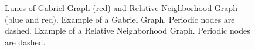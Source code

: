     \begin{figure}[htbp]
        \centering
        \caption[Gabriel - and Relative Neighborhood Graph]
                { Lunes of Gabriel Graph (red)
                    and Relative Neighborhood Graph (blue and red).
                  Example of a Gabriel Graph.
                    Periodic nodes are dashed.
                  Example of a Relative
                    Neighborhood Graph. Periodic nodes are dashed.}
        \label{fig:lunes}

    \end{figure}

